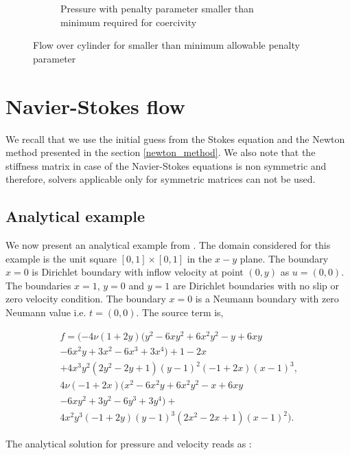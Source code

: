 \documentclass[a4paper,twoside,openright]{book}
\begin{document}
\begin{figure}
\begin{subfigure}{\textwidth}
    \caption{Pressure with penalty parameter smaller than minimum required for coercivity}
      \label{pressure_stoke_c11_low}
\end{subfigure}
\caption{Flow over cylinder for smaller than minimum allowable penalty parameter}
\label{flow_over_cylinder_c11_low}
\end{figure}

\section{Navier-Stokes flow}\label{N-S-ch5}

We recall that we use the initial guess from the Stokes equation and the Newton method presented in the section \ref{newton_method}. We also note that the stiffness matrix in case of the Navier-Stokes equations is non symmetric and therefore, solvers applicable only for symmetric matrices can not be used. 

\subsection{Analytical example}

We now present an analytical example from \cite{Montlaur}. The domain considered for this example is the unit square $[0,1] \times [0,1]$ in the $x-y$ plane. 
The boundary ${x=0}$ is Dirichlet boundary with inflow velocity at point $(0,y)$ as $u = (0, 0)$. The boundaries ${x = 1}$, ${y = 0}$ and ${y = 1}$ are Dirichlet boundaries with no slip or zero velocity condition. The boundary ${x = 0}$ is a Neumann boundary with zero Neumann value i.e. $t = (0, 0)$. The source term is,

\begin{equation}
\begin{split}
f = (-4 \nu (1+2y) (y^2 - 6xy^2 + 6x^2 y^2 - y + 6xy \\ - 6x^2 y + 3x^2 - 6x^3 + 3x^4)+ 1 - 2x \\+ 4x^3 y^2 (2y^2 - 2y + 1)(y - 1)^2 (-1 + 2x)(x - 1)^3 \textrm{,}\\ 4 \nu (-1 + 2x)(x^2 - 6x^2 y + 6x^2 y^2 - x + 6xy \\ - 6xy^2 + 3y^2 - 6y^3 + 3y^4) + \\ 4x^2y^3 (-1+2y)(y-1)^3 (2x^2-2x+1)(x-1)^2) \textrm{.}
\end{split}
\end{equation}
 
The analytical solution for pressure and velocity reads as :
\end{document}
